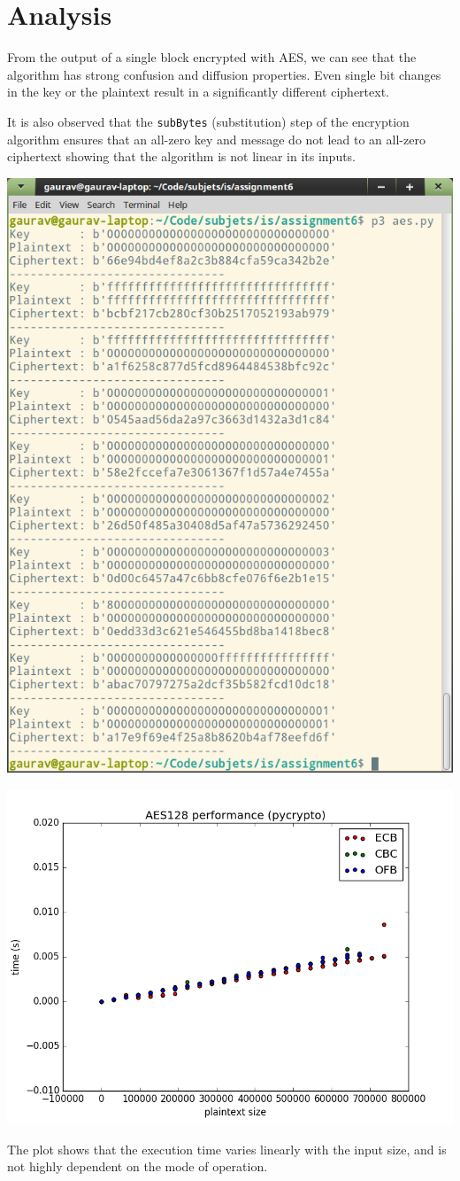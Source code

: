 \documentclass[main.tex]{subfiles}
\begin{document}
\section{Analysis}
From the output of a single block encrypted with AES, we can see that the
algorithm has strong confusion and diffusion properties. Even single bit changes
in the key or the plaintext result in a significantly different ciphertext.

It is also observed that the \texttt{subBytes} (substitution) step of the
encryption algorithm ensures that an all-zero key and message do not lead to an
all-zero ciphertext showing that the algorithm is not linear in its inputs.


\includegraphics[width=\textwidth]{output.png}


\includegraphics[width=\textwidth]{plot.png}

The plot shows that the execution time varies linearly with the input size, and
is not highly dependent on the mode of operation.
\end{document}
